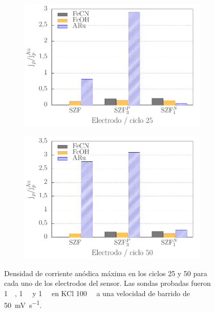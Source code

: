 {			\begin{figure}[h!]
		 	\begin{subfigure}[t]{0.495\textwidth}
		 	 \includegraphics[width=\textwidth]{Graficos/histogramas-ciclo25.pdf}
		 	  \end{subfigure}
			\begin{subfigure}[t]{0.495\textwidth}
		 	   \includegraphics[width=\textwidth]{Graficos/histogramas-ciclo50.pdf}
		 	   \end{subfigure}
		      	\caption[Corriente de pico en distintos ciclos voltamperometricos]{Densidad de corriente anódica máxima en los ciclos 25 y 50 para cada uno de los electrodos del sensor. Las sondas probadas fueron \fc \SI{1}{\milli\Molar}, \fe\space \SI{1}{\milli\Molar} y \ru\space \SI{1}{\milli\Molar} en KCl \SI{100}{\milli\Molar} a una velocidad de barrido de \SI{50}{\milli\volt\per\second}.}
		      	\label{fig:barras}
		      	\end{figure}


}

